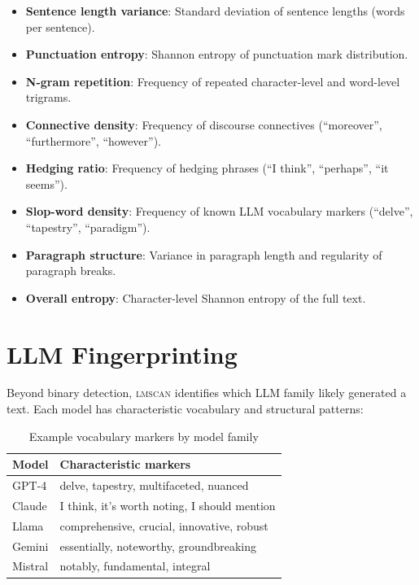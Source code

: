 \documentclass[11pt]{article}
\begin{document}
\begin{itemize}
    \item \textbf{Sentence length variance}: Standard deviation of sentence lengths (words per sentence).
    \item \textbf{Punctuation entropy}: Shannon entropy of punctuation mark distribution.
    \item \textbf{N-gram repetition}: Frequency of repeated character-level and word-level trigrams.
    \item \textbf{Connective density}: Frequency of discourse connectives (``moreover'', ``furthermore'', ``however'').
    \item \textbf{Hedging ratio}: Frequency of hedging phrases (``I think'', ``perhaps'', ``it seems'').
    \item \textbf{Slop-word density}: Frequency of known LLM vocabulary markers (``delve'', ``tapestry'', ``paradigm'').
    \item \textbf{Paragraph structure}: Variance in paragraph length and regularity of paragraph breaks.
    \item \textbf{Overall entropy}: Character-level Shannon entropy of the full text.
\end{itemize}

\section{LLM Fingerprinting}

Beyond binary detection, \textsc{lmscan} identifies which LLM family likely generated a text. Each model has characteristic vocabulary and structural patterns:

\begin{table}[h]
\centering
\caption{Example vocabulary markers by model family}
\begin{tabular}{ll}
\toprule
\textbf{Model} & \textbf{Characteristic markers} \\
\midrule
GPT-4 & delve, tapestry, multifaceted, nuanced \\
Claude & I think, it's worth noting, I should mention \\
Llama & comprehensive, crucial, innovative, robust \\
Gemini & essentially, noteworthy, groundbreaking \\
Mistral & notably, fundamental, integral \\
\bottomrule
\end{tabular}
\end{table}
\end{document}
